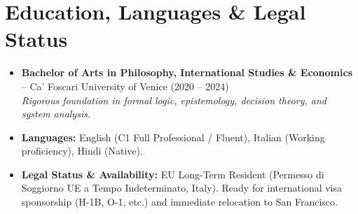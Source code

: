 \documentclass[a4paper,10pt]{article}
\begin{document}
\section{Education, Languages \& Legal Status}
\begin{itemize}
  \item \textbf{Bachelor of Arts in Philosophy, International Studies \& Economics} -- Ca' Foscari University of Venice (2020 -- 2024) \\
  \textit{Rigorous foundation in formal logic, epistemology, decision theory, and system analysis.}
  \item \textbf{Languages:} English (C1 Full Professional / Fluent), Italian (Working proficiency), Hindi (Native).
  \item \textbf{Legal Status \& Availability:} EU Long-Term Resident (Permesso di Soggiorno UE a Tempo Indeterminato, Italy). Ready for international visa sponsorship (H-1B, O-1, etc.) and immediate relocation to San Francisco.
\end{itemize}
\end{document}
